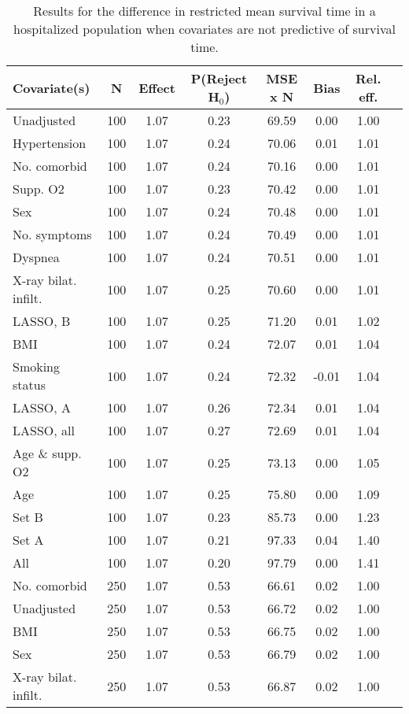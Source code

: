 \documentclass{article}
\begin{document}
{\tabcolsep=6pt  %
\begin{longtable}{lccccccc}
\caption{Results for the difference in restricted mean survival time in a hospitalized population when covariates are not predictive of survival time.}\label{tab9}\\
Covariate(s) & N & Effect & P(Reject H$_0$) & MSE x N & Bias & Rel. eff.\\ \midrule
Unadjusted & 100 & 1.07 & 0.23 & 69.59 & 0.00 & 1.00\\
Hypertension & 100 & 1.07 & 0.24 & 70.06 & 0.01 & 1.01\\
No. comorbid & 100 & 1.07 & 0.24 & 70.16 & 0.00 & 1.01\\
Supp. O2 & 100 & 1.07 & 0.23 & 70.42 & 0.00 & 1.01\\
Sex & 100 & 1.07 & 0.24 & 70.48 & 0.00 & 1.01\\
No. symptoms & 100 & 1.07 & 0.24 & 70.49 & 0.00 & 1.01\\
Dyspnea & 100 & 1.07 & 0.24 & 70.51 & 0.00 & 1.01\\
X-ray bilat. infilt. & 100 & 1.07 & 0.25 & 70.60 & 0.00 & 1.01\\
LASSO, B & 100 & 1.07 & 0.25 & 71.20 & 0.01 & 1.02\\
BMI & 100 & 1.07 & 0.24 & 72.07 & 0.01 & 1.04\\
Smoking status & 100 & 1.07 & 0.24 & 72.32 & -0.01 & 1.04\\
LASSO, A & 100 & 1.07 & 0.26 & 72.34 & 0.01 & 1.04\\
LASSO, all & 100 & 1.07 & 0.27 & 72.69 & 0.01 & 1.04\\
Age \& supp. O2 & 100 & 1.07 & 0.25 & 73.13 & 0.00 & 1.05\\
Age & 100 & 1.07 & 0.25 & 75.80 & 0.00 & 1.09\\
Set B & 100 & 1.07 & 0.23 & 85.73 & 0.00 & 1.23\\
Set A & 100 & 1.07 & 0.21 & 97.33 & 0.04 & 1.40\\
All & 100 & 1.07 & 0.20 & 97.79 & 0.00 & 1.41\\ \midrule
No. comorbid & 250 & 1.07 & 0.53 & 66.61 & 0.02 & 1.00\\
Unadjusted & 250 & 1.07 & 0.53 & 66.72 & 0.02 & 1.00\\
BMI & 250 & 1.07 & 0.53 & 66.75 & 0.02 & 1.00\\
Sex & 250 & 1.07 & 0.53 & 66.79 & 0.02 & 1.00\\
X-ray bilat. infilt. & 250 & 1.07 & 0.53 & 66.87 & 0.02 & 1.00\\

\end{longtable}}
\end{document}

